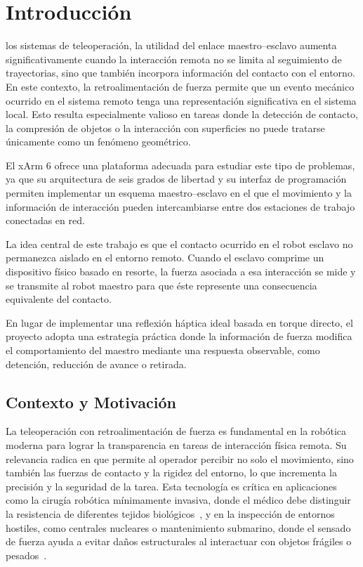 \documentclass[journal,10pt,twoside]{IEEEtran}
\begin{document}
\section{Introducción}

 los sistemas de teleoperación, la utilidad del enlace maestro--esclavo aumenta significativamente
cuando la interacción remota no se limita al seguimiento de trayectorias, sino que también incorpora información 
del contacto con el entorno. En este contexto, la retroalimentación de fuerza permite que un evento mecánico 
ocurrido en el sistema remoto tenga una representación significativa en el sistema local. Esto resulta 
especialmente valioso en tareas donde la detección de contacto, la compresión de objetos o la interacción 
con superficies no puede tratarse únicamente como un fenómeno geométrico.

El xArm 6 ofrece una plataforma adecuada para estudiar este tipo de problemas, ya que su arquitectura de seis grados 
de libertad y su interfaz de programación permiten implementar un esquema maestro--esclavo en el que el movimiento 
y la información de interacción pueden intercambiarse entre dos estaciones de trabajo conectadas en red.

\begin{theorybox}[Motivación]
La idea central de este trabajo es que el contacto ocurrido en el robot esclavo no permanezca aislado en el entorno 
remoto. Cuando el esclavo comprime un dispositivo físico basado en resorte, la fuerza asociada a esa interacción 
se mide y se transmite al robot maestro para que éste represente una consecuencia equivalente del contacto. 

En lugar de implementar una reflexión háptica ideal basada en torque directo, el proyecto adopta una estrategia 
práctica donde la información de fuerza modifica el comportamiento del maestro mediante una respuesta observable, 
como detención, reducción de avance o retirada.
\end{theorybox}

\subsection{Contexto y Motivación}

La teleoperación con retroalimentación de fuerza es fundamental en la robótica moderna para lograr la transparencia 
en tareas de interacción física remota. Su relevancia radica en que permite al operador percibir no solo el movimiento,
sino también las fuerzas de contacto y la rigidez del entorno, lo que incrementa la precisión y la seguridad de la 
tarea. Esta tecnología es crítica en aplicaciones como la cirugía robótica mínimamente invasiva, donde el médico 
debe distinguir la resistencia de diferentes tejidos biológicos~\cite{sanchez2002}, y en la inspección de entornos 
hostiles, como centrales nucleares o mantenimiento submarino, donde el sensado de fuerza ayuda a evitar daños 
estructurales al interactuar con objetos frágiles o pesados~\cite{postigo2001}.
\end{document}
